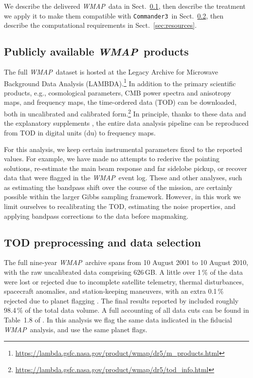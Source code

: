 \documentclass[twocolumn]{../../common/aa}
\def\WMAP{\emph{WMAP}}
\def\commanderthree{\texttt{Commander3}}
\begin{document}
We describe the delivered \WMAP\ data in Sect.~\ref{sec:products}, then describe the treatment we apply it to make them compatible with \commanderthree\ in Sect.~\ref{sec:preprocessing}, then describe the computational requirements in Sect.~\ref{sec:resources}.


\subsection{Publicly available \WMAP\ products}
\label{sec:products}

The full \WMAP\ dataset is hosted at the Legacy Archive for Microwave Background Data Analysis (LAMBDA).\footnote{\url{https://lambda.gsfc.nasa.gov/product/wmap/dr5/m_products.html}} In addition to the primary scientific products, e.g., cosmological parameters, CMB power spectra and anisotropy maps, and frequency maps, the time-ordered data (TOD) can be downloaded, both in uncalibrated and calibrated form.\footnote{\url{https://lambda.gsfc.nasa.gov/product/wmap/dr5/tod_info.html}} In principle, thanks to these data and the explanatory supplements \citep{wmapexsupp}, the entire data analysis pipeline can be reproduced from TOD in digital units (du) to frequency maps.

For this analysis, we keep certain instrumental parameters fixed to the reported values. For example, we have made no attempts to rederive the pointing solutions, re-estimate the main beam response and far sidelobe pickup, or recover data that were flagged in the \WMAP\ event log. These and other analyses, such as estimating the bandpass shift over the course of the mission, are certainly possible within the larger Gibbs sampling framework. However, in this work we limit ourselves to recalibrating the TOD, estimating the noise properties, and applying bandpass corrections to the data before mapmaking.

\subsection{TOD preprocessing and data selection}
\label{sec:preprocessing}


The full nine-year \WMAP\ archive spans from 10 August 2001 to 10 August 2010, with the raw uncalibrated data comprising 626\,GB. A little over 1\,\% of the data were lost or rejected due to incomplete satellite telemetry, thermal disturbances, spacecraft anomalies, and station-keeping maneuvers, with an extra 0.1\,\% rejected due to planet flagging \citep{bennett2003a,hinshaw2007,hinshaw2009,bennett2012}. 
The final results reported by \citet{bennett2012} included roughly 98.4\,\% of the total data volume.
A full accounting of all data cuts can be found in Table~1.8 of \citet{wmapexsupp}. In this analysis we flag the same data indicated in the fiducial \WMAP\ analysis, and use the same planet flags.
\end{document}
